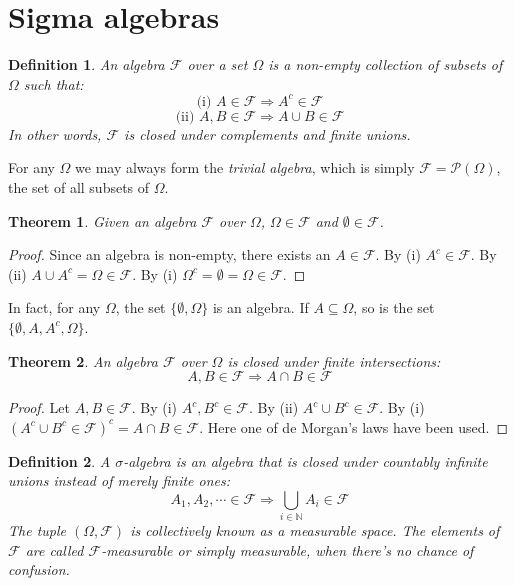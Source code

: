 \documentclass[12pt, a4paper]{article}
\newtheorem{theorem}{Theorem}[section]
\newtheorem{definition}{Definition}[section]
\numberwithin{equation}{section}
\begin{document}
\section{Sigma algebras}
\begin{definition}
An \textit{algebra} $\mathcal{F}$ over a set $\Omega$ is a non-empty collection of subsets of $\Omega$ such that:
\begin{equation}
\textrm{(i) }A\in\mathcal{F}\Rightarrow A^c\in\mathcal{F}
\end{equation}
\begin{equation}
\textrm{(ii) }A, B\in\mathcal{F}\Rightarrow A\cup B\in\mathcal{F}
\end{equation}
In other words, $\mathcal{F}$ is closed under complements and finite unions.
\end{definition}

For any $\Omega$ we may always form the \textit{trivial algebra}, which is simply $\mathcal{F}=\mathcal{P}(\Omega)$, the set of all subsets of $\Omega$.

\begin{theorem}
Given an algebra $\mathcal{F}$ over $\Omega$, $\Omega\in\mathcal{F}$ and $\emptyset\in\mathcal{F}$.
\end{theorem}
\begin{proof}
Since an algebra is non-empty, there exists an $A\in\mathcal{F}$. By (i) $A^c\in\mathcal{F}$. By (ii) $A\cup A^c=\Omega\in\mathcal{F}$. By (i) $\Omega^c=\emptyset=\Omega\in\mathcal{F}$.
\end{proof}

In fact, for any $\Omega$, the set $\{\emptyset,\Omega\}$ is an algebra. If $A\subseteq\Omega$, so is the set $\{\emptyset,A,A^c,\Omega\}$.

\begin{theorem}
\label{finite_union}
An algebra $\mathcal{F}$ over $\Omega$ is closed under finite intersections:
\begin{equation}
A, B\in\mathcal{F}\Rightarrow A\cap B\in\mathcal{F}
\end{equation}
\end{theorem}
\begin{proof}
Let $A, B\in\mathcal{F}$. By (i) $A^c, B^c\in\mathcal{F}$. By (ii) $A^c\cup B^c\in\mathcal{F}$. By (i) $(A^c\cup B^c\in\mathcal{F})^c=A\cap B\in\mathcal{F}$. Here one of de Morgan's laws have been used.
\end{proof}

\begin{definition}
A $\sigma$-algebra is an algebra that is closed under countably infinite unions instead of merely finite ones:
\begin{equation}
A_1, A_2,\cdots\in\mathcal{F}\Rightarrow\underset{i\in\mathbb{N}}{\bigcup}A_i\in\mathcal{F}
\end{equation}
The tuple $(\Omega,\mathcal{F})$ is collectively known as a measurable space. The elements of $\mathcal{F}$ are called $\mathcal{F}$-measurable or simply measurable, when there's no chance of confusion.
\end{definition}
\end{document}

